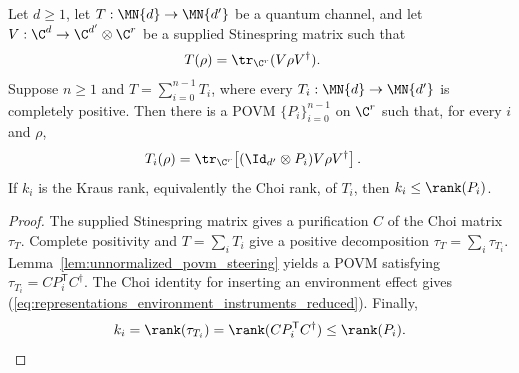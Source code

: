 \begin{theorem}
    \label{thm:environment_induced_instruments_stinespring}
    \leanok
    Let $d\geq1$, let $T:\MN{d}\to\MN{d'}$ be a quantum channel, and let
    $V:\C^d\to\C^{d'}\otimes\C^r$ be a supplied Stinespring matrix such
    that
    \begin{align}
        T(\rho)&=\tr_{\C^r}(V\rho V^\dagger).
        \label{eq:representations_environment_instruments_stinespring}
    \end{align}
    Suppose $n\geq1$ and
    $T=\sum_{i=0}^{n-1}T_i$, where every
    $T_i:\MN{d}\to\MN{d'}$ is completely positive. Then there is a POVM
    $\{P_i\}_{i=0}^{n-1}$ on $\C^r$ such that, for every $i$ and $\rho$,
    \begin{align}
        T_i(\rho)
        &=\tr_{\C^r}\!\left[(\Id_{d'}\otimes P_i)
          V\rho V^\dagger\right].
        \label{eq:representations_environment_instruments_reduced}
    \end{align}
    If $k_i$ is the Kraus rank, equivalently the Choi rank, of $T_i$, then
    $k_i\leq\rank(P_i)$.
\end{theorem}

\begin{proof}\leanok
    The supplied Stinespring matrix gives a purification $C$ of the Choi
    matrix $\tau_T$. Complete positivity and
    $T=\sum_iT_i$ give a positive decomposition
    $\tau_T=\sum_i\tau_{T_i}$. Lemma~\ref{lem:unnormalized_povm_steering}
    yields a POVM satisfying
    $\tau_{T_i}=CP_i^{\mathsf T}C^\dagger$. The Choi identity for inserting
    an environment effect gives
    (\ref{eq:representations_environment_instruments_reduced}). Finally,
    \begin{align}
        k_i=\rank(\tau_{T_i})
        =\rank(CP_i^{\mathsf T}C^\dagger)
        \leq\rank(P_i).
        \notag
    \end{align}
\end{proof}

